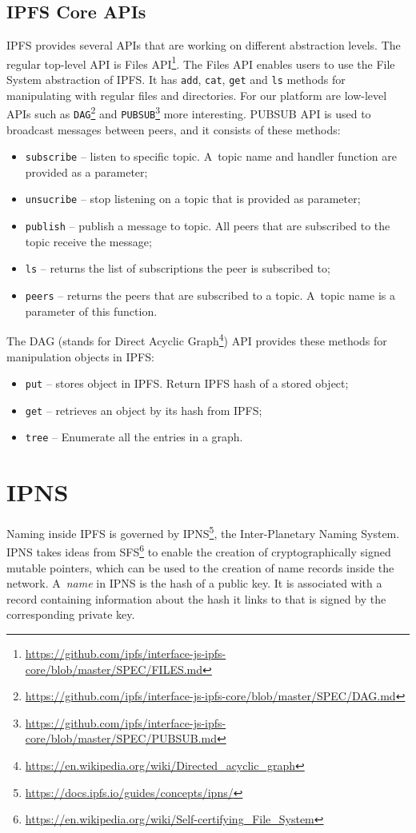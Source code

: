 \subsection{IPFS Core APIs}
\label{ipfsApis}
IPFS provides several APIs that are working on different abstraction levels. The regular top-level API is Files API\footnote{\url{https://github.com/ipfs/interface-js-ipfs-core/blob/master/SPEC/FILES.md}}. The Files API enables users to use the File System abstraction of IPFS. It has \texttt{add}, \texttt{cat}, \texttt{get} and \texttt{ls} methods for manipulating with regular files and directories. For our platform are low-level APIs such as \texttt{DAG}\footnote{\url{https://github.com/ipfs/interface-js-ipfs-core/blob/master/SPEC/DAG.md}} and \texttt{PUBSUB}\footnote{\url{https://github.com/ipfs/interface-js-ipfs-core/blob/master/SPEC/PUBSUB.md}} more interesting. PUBSUB API is used to broadcast messages between peers, and it consists of these methods:
\begin{itemize}
    \item \texttt{subscribe} -- listen to specific topic. A~topic name and handler function are provided as a parameter;
    \item \texttt{unsucribe} -- stop listening on a topic that is provided as parameter;
    \item \texttt{publish} -- publish a message to topic. All peers that are subscribed to the topic receive the message;
    \item \texttt{ls} -- returns the list of subscriptions the peer is subscribed to;
    \item \texttt{peers} -- returns the peers that are subscribed to a topic. A~topic name is a parameter of this function.
\end{itemize}
The DAG (stands for Direct Acyclic Graph\footnote{\url{https://en.wikipedia.org/wiki/Directed_acyclic_graph}}) API provides these methods for manipulation objects in IPFS:
\begin{itemize}
    \item \texttt{put} -- stores object in IPFS. Return IPFS hash of a stored object;
    \item \texttt{get} -- retrieves an object by its hash from IPFS;
    \item \texttt{tree} -- Enumerate all the entries in a graph.
\end{itemize}

\section{IPNS}
Naming inside IPFS is governed by IPNS\footnote{\url{https://docs.ipfs.io/guides/concepts/ipns/}}, the Inter-Planetary Naming System. IPNS takes ideas from SFS\footnote{\url{https://en.wikipedia.org/wiki/Self-certifying_File_System}} to enable the creation of cryptographically signed mutable pointers, which can be used to the creation of name records inside the network. A~\textit{name} in IPNS is the hash of a public key. It is associated with a record containing information about the hash it links to that is signed by the corresponding private key.

